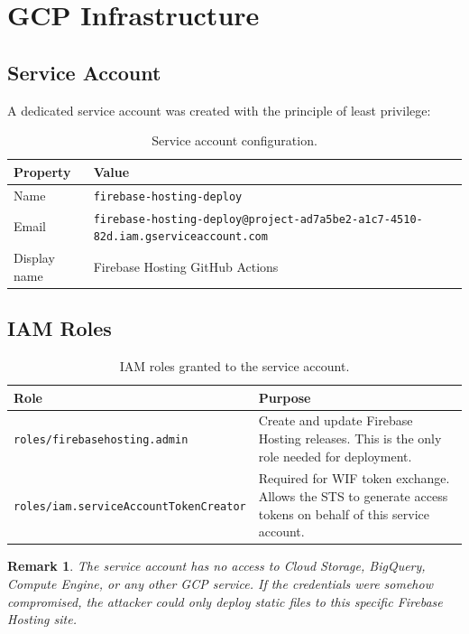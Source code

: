 \documentclass[11pt,a4paper]{article}
\theoremstyle{plainref}
\newtheorem{remark}[definition]{Remark}
\begin{document}
\section{GCP Infrastructure}

\subsection{Service Account}

A dedicated service account was created with the principle of least privilege:

\begin{table}[h]
\centering
\caption{Service account configuration.}
\begin{tabular}{@{}ll@{}}
\toprule
\textbf{Property} & \textbf{Value} \\
\midrule
Name & \texttt{firebase-hosting-deploy} \\
Email & \texttt{firebase-hosting-deploy@project-ad7a5be2-a1c7-4510-82d.iam.gserviceaccount.com} \\
Display name & Firebase Hosting GitHub Actions \\
\bottomrule
\end{tabular}
\end{table}

\subsection{IAM Roles}

\begin{table}[h]
\centering
\caption{IAM roles granted to the service account.}
\begin{tabular}{@{}lp{9cm}@{}}
\toprule
\textbf{Role} & \textbf{Purpose} \\
\midrule
\texttt{roles/firebasehosting.admin} & Create and update Firebase Hosting releases. This is the only role needed for deployment. \\
\texttt{roles/iam.serviceAccountTokenCreator} & Required for WIF token exchange. Allows the STS to generate access tokens on behalf of this service account. \\
\bottomrule
\end{tabular}
\end{table}

\begin{remark}
The service account has no access to Cloud Storage, BigQuery, Compute Engine, or any other GCP service. If the credentials were somehow compromised, the attacker could only deploy static files to this specific Firebase Hosting site.
\end{remark}
\end{document}

